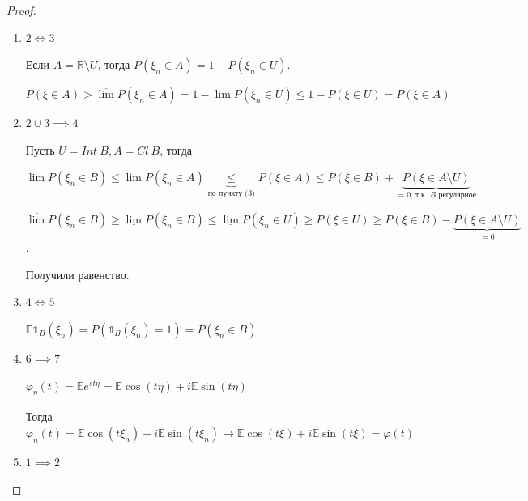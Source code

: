 \begin{proof}
    \begin{enumerate}
        \item {
            $2 \Longleftrightarrow 3$

            Если $A = \mathbb{R} \setminus U$, тогда $P(\xi_n \in A) = 1 - P(\xi_n \in U)$.

            $P(\xi \in A) > \overline{\lim} P(\xi_n \in A) = 1 - \underline{\lim} P(\xi_n \in U) \leqslant 1 - P(\xi \in U) = P(\xi \in A)$
        }
        \item {
            $2 \cup 3 \implies 4$




            Пусть $U = Int \ B, A = Cl \ B$, тогда 

            $\overline{\lim} P(\xi_n \in B) \leq \overline{\lim} P(\xi_n \in A) \underbrace{\leq}_{\text{по пункту (3)}} P(\xi \in A) \leq P(\xi \in B) + \underbrace{P(\xi \in A \setminus U)}_{\text{$=0$, т.к. $B$ регулярное}}$

            $\overline{\lim} P(\xi_n \in B) \geq \underline{\lim} P(\xi_n \in B) \leq \underline{\lim} P(\xi_n \in U) \geq P(\xi \in U) \geq P(\xi \in B) - \underbrace{P(\xi \in A \setminus U)}_{=0}$.

            Получили равенство.
        }
        \item {
            $4 \Longleftrightarrow 5$

            $\mathbb{E} \mathds{1}_B (\xi_n) = P(\mathds{1}_B (\xi_n) = 1) = P(\xi_n \in B)$
        }
        \item {
            $6 \implies 7$

            $\varphi_{\eta} (t) = \mathbb{E} e^{et\eta} = \mathbb{E} \cos (t\eta) + i \mathbb{E} \sin (t \eta)$

            Тогда $\varphi_n(t) = \mathbb{E} \cos (t \xi_n) + i\mathbb{E} \sin (t\xi_n) \rightarrow \mathbb{E} \cos (t\xi) + i \mathbb{E} \sin (t\xi) = \varphi (t)$
        }
        \item {
            $1 \implies 2$

}
\end{enumerate}
\end{proof}
